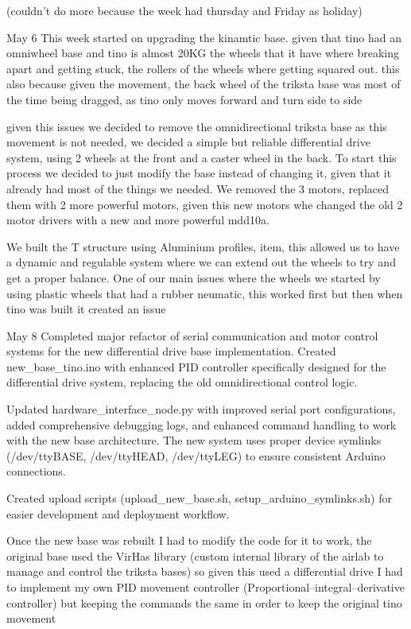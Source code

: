 (couldn't do more because the week had thursday and Friday as holiday)

May 6
This week started on upgrading the kinamtic base. given that tino had an omniwheel base and tino is almost 20KG the wheels that it have where breaking apart and getting stuck, the rollers of the wheels where getting squared out. this also because given the movement, the back wheel of the triksta base was most of the time being dragged, as tino only moves forward and turn side to side

given this issues we decided to remove the omnidirectional triksta base as this movement is not needed, we decided a simple but reliable differential drive system, using 2 wheels at the front and a caster wheel in the back. To start this process we decided to just modify the base instead of changing it, given that it already had most of the things we needed.
We removed the 3 motors, replaced them with 2 more powerful motors, given this new motors whe changed the old 2 motor drivers with a new and more powerful mdd10a.

We built the T structure using Aluminium profiles, item, this allowed us to have a dynamic and regulable system where we can extend out the wheels to try and get a proper balance.
One of our main issues where the wheels we started by using plastic wheels that had a rubber neumatic, this worked first but then when tino was built it created an issue

May 8
Completed major refactor of serial communication and motor control systems for the new differential drive base implementation. Created new\_base\_tino.ino with enhanced PID controller specifically designed for the differential drive system, replacing the old omnidirectional control logic.

Updated hardware\_interface\_node.py with improved serial port configurations, added comprehensive debugging logs, and enhanced command handling to work with the new base architecture. The new system uses proper device symlinks (/dev/ttyBASE, /dev/ttyHEAD, /dev/ttyLEG) to ensure consistent Arduino connections.

Created upload scripts (upload\_new\_base.sh, setup\_arduino\_symlinks.sh) for easier development and deployment workflow.

Once the new base was rebuilt I had to modify the code for it to work, the original base used the VirHas library (custom internal library of the airlab to manage and control the triksta bases) so given this used a differential drive I had to implement my own PID movement controller (Proportional–integral–derivative controller) but keeping the commands the same in order to keep the original tino movement

